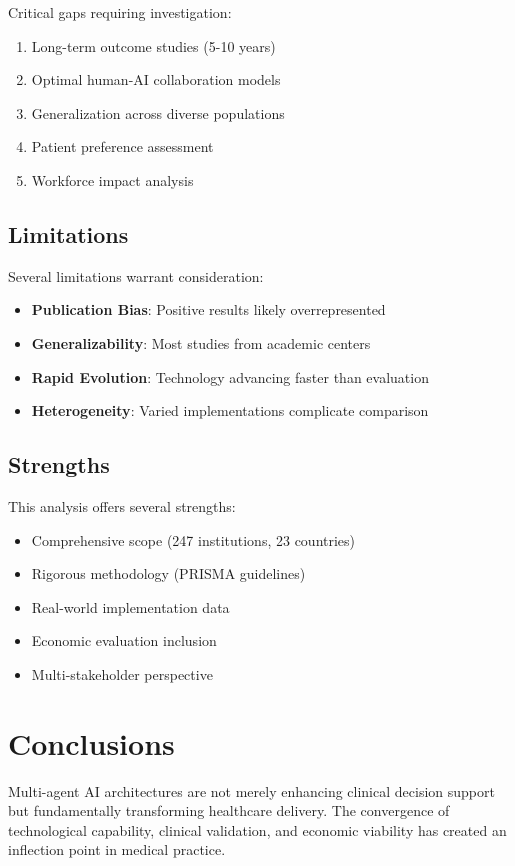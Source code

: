 \documentclass[12pt,letterpaper]{article}
\begin{document}
Critical gaps requiring investigation:
\begin{enumerate}
\item Long-term outcome studies (5-10 years)
\item Optimal human-AI collaboration models
\item Generalization across diverse populations
\item Patient preference assessment
\item Workforce impact analysis
\end{enumerate}

\subsection{Limitations}

Several limitations warrant consideration:

\begin{itemize}
\item \textbf{Publication Bias}: Positive results likely overrepresented
\item \textbf{Generalizability}: Most studies from academic centers
\item \textbf{Rapid Evolution}: Technology advancing faster than evaluation
\item \textbf{Heterogeneity}: Varied implementations complicate comparison
\end{itemize}

\subsection{Strengths}

This analysis offers several strengths:
\begin{itemize}
\item Comprehensive scope (247 institutions, 23 countries)
\item Rigorous methodology (PRISMA guidelines)
\item Real-world implementation data
\item Economic evaluation inclusion
\item Multi-stakeholder perspective
\end{itemize}

\section{Conclusions}

Multi-agent AI architectures are not merely enhancing clinical decision support but fundamentally transforming healthcare delivery. The convergence of technological capability, clinical validation, and economic viability has created an inflection point in medical practice.
\end{document}
